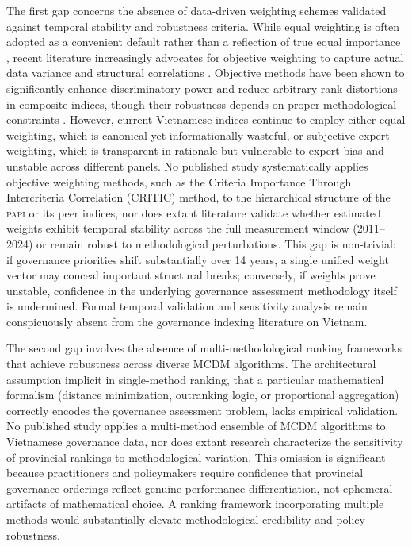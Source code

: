 \documentclass[12pt,a4paper]{article}
\newcommand{\PAPI}{\textsc{papi}\xspace}
\begin{document}
The first gap concerns the absence of data-driven weighting schemes validated against temporal stability and robustness criteria. While equal weighting is often adopted as a convenient default rather than a reflection of true equal importance \citep{Seth2018}, recent literature increasingly advocates for objective weighting to capture actual data variance and structural correlations \citep{Greco2018, Becker2017}. Objective methods have been shown to significantly enhance discriminatory power and reduce arbitrary rank distortions in composite indices, though their robustness depends on proper methodological constraints \citep{Liborio2024}. However, current Vietnamese indices continue to employ either equal weighting, which is canonical yet informationally wasteful, or subjective expert weighting, which is transparent in rationale but vulnerable to expert bias and unstable across different panels. No published study systematically applies objective weighting methods, such as the Criteria Importance Through Intercriteria Correlation (CRITIC) method, to the hierarchical structure of the \PAPI or its peer indices, nor does extant literature validate whether estimated weights exhibit temporal stability across the full measurement window (2011--2024) or remain robust to methodological perturbations. This gap is non-trivial: if governance priorities shift substantially over 14 years, a single unified weight vector may conceal important structural breaks; conversely, if weights prove unstable, confidence in the underlying governance assessment methodology itself is undermined. Formal temporal validation and sensitivity analysis remain conspicuously absent from the governance indexing literature on Vietnam.

The second gap involves the absence of multi-methodological ranking frameworks that achieve robustness across diverse MCDM algorithms. The architectural assumption implicit in single-method ranking, that a particular mathematical formalism (distance minimization, outranking logic, or proportional aggregation) correctly encodes the governance assessment problem, lacks empirical validation. No published study applies a multi-method ensemble of MCDM algorithms to Vietnamese governance data, nor does extant research characterize the sensitivity of provincial rankings to methodological variation. This omission is significant because practitioners and policymakers require confidence that provincial governance orderings reflect genuine performance differentiation, not ephemeral artifacts of mathematical choice. A ranking framework incorporating multiple methods would substantially elevate methodological credibility and policy robustness.
\end{document}
